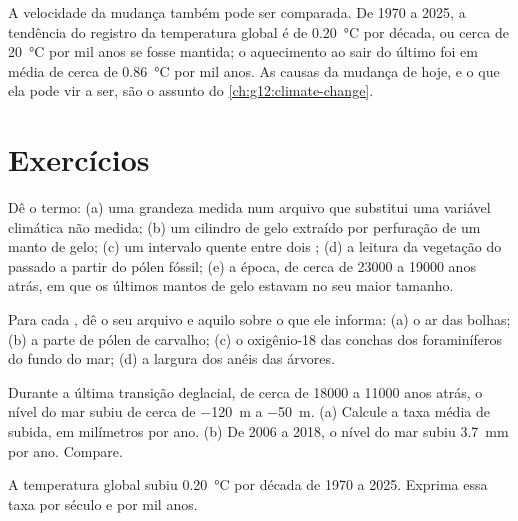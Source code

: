A velocidade da mudança também pode ser comparada. De 1970 a 2025, a
tendência do registro da temperatura global é de \qty{0.20}{\degreeCelsius}
por década, ou cerca de \qty{20}{\degreeCelsius} por mil anos se fosse
mantida; o aquecimento ao sair do último  foi em média de
cerca de \qty{0.86}{\degreeCelsius} por mil anos. As causas da mudança de
hoje, e o que ela pode vir a ser, são o assunto do \cref{ch:g12:climate-change}.

\section{Exercícios}

\begin{exercise}[$\star$]\label{exo:g12:past-climates:1}
Dê o termo: (a) uma grandeza medida num arquivo que substitui uma variável
climática não medida; (b) um cilindro de gelo extraído por perfuração de um
manto de gelo; (c) um intervalo quente entre dois ; (d) a
leitura da vegetação do passado a partir do pólen fóssil; (e) a época, de
cerca de \num{23000} a \num{19000} anos atrás, em que os últimos mantos de
gelo estavam no seu maior tamanho.
\end{exercise}

\begin{exercise}[$\star$]\label{exo:g12:past-climates:2}
Para cada , dê o seu arquivo e aquilo sobre o que ele informa: (a)
o ar das bolhas; (b) a parte de pólen de carvalho; (c) o oxigênio-18 das
conchas dos foraminíferos do fundo do mar; (d) a largura dos anéis das
árvores.
\end{exercise}

\begin{exercise}[$\star$]\label{exo:g12:past-climates:3}
Durante a última transição deglacial, de cerca de \num{18000} a \num{11000}
anos atrás, o nível do mar subiu de cerca de \qty{-120}{m} a \qty{-50}{m}.
(a) Calcule a taxa média de subida, em milímetros por ano. (b) De 2006 a
2018, o nível do mar subiu \qty{3.7}{mm} por ano. Compare.
\end{exercise}

\begin{exercise}[$\star$]\label{exo:g12:past-climates:4}
A temperatura global subiu \qty{0.20}{\degreeCelsius} por década de 1970 a
2025. Exprima essa taxa por século e por mil anos.
\end{exercise}

